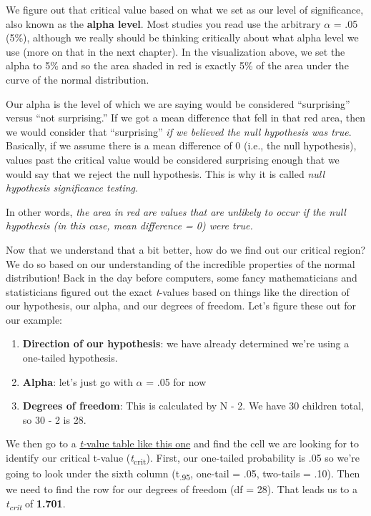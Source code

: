 \documentclass[
]{book}
\providecommand{\tightlist}{%
  \setlength{\itemsep}{0pt}\setlength{\parskip}{0pt}}
\begin{document}
We figure out that critical value based on what we set as our level of significance, also known as the \textbf{alpha level}. Most studies you read use the arbitrary \(\alpha\) = .05 (5\%), although we really should be thinking critically about what alpha level we use (more on that in the next chapter). In the visualization above, we set the alpha to 5\% and so the area shaded in red is exactly 5\% of the area under the curve of the normal distribution.

Our alpha is the level of which we are saying would be considered ``surprising'' versus ``not surprising.'' If we got a mean difference that fell in that red area, then we would consider that ``surprising'' \emph{if we believed the null hypothesis was true}. Basically, if we assume there is a mean difference of 0 (i.e., the null hypothesis), values past the critical value would be considered surprising enough that we would say that we reject the null hypothesis. This is why it is called \emph{null hypothesis significance testing}.

In other words, \emph{the area in red are values that are unlikely to occur if the null hypothesis (in this case, mean difference = 0) were true.}

Now that we understand that a bit better, how do we find out our critical region? We do so based on our understanding of the incredible properties of the normal distribution! Back in the day before computers, some fancy mathematicians and statisticians figured out the exact \emph{t}-values based on things like the direction of our hypothesis, our alpha, and our degrees of freedom. Let's figure these out for our example:

\begin{enumerate}
\def\labelenumi{\arabic{enumi}.}
\tightlist
\item
  \textbf{Direction of our hypothesis}: we have already determined we're using a one-tailed hypothesis.
\item
  \textbf{Alpha}: let's just go with \(\alpha\) = .05 for now
\item
  \textbf{Degrees of freedom}: This is calculated by N - 2. We have 30 children total, so 30 - 2 is 28.
\end{enumerate}

We then go to a \href{http://www.z-table.com/t-value-table.html}{\emph{t-}value table like this one} and find the cell we are looking for to identify our critical t-value (\emph{t}\textsubscript{crit}). First, our one-tailed probability is .05 so we're going to look under the sixth column (t\textsubscript{.95}, one-tail = .05, two-tails = .10). Then we need to find the row for our degrees of freedom (df = 28). That leads us to a \emph{t\textsubscript{crit}} of \textbf{1.701}.
\end{document}
